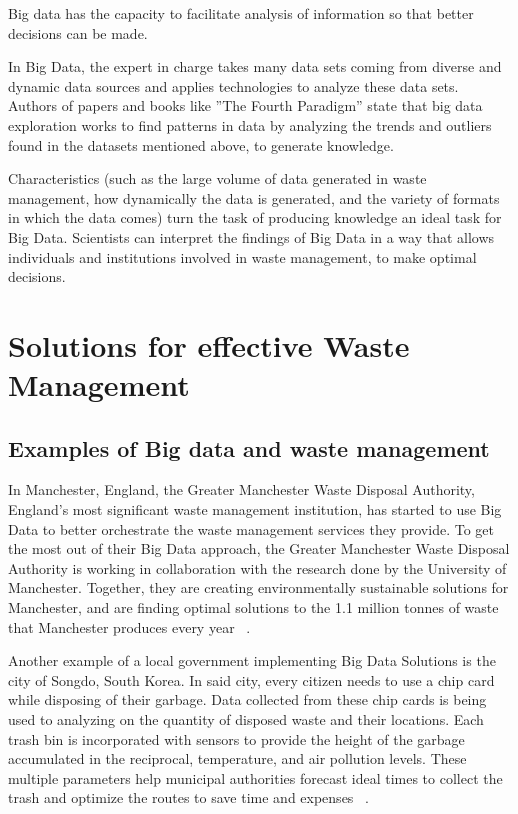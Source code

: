 \documentclass[sigconf]{acmart}
\begin{document}
Big data has the capacity to facilitate analysis of information so that better decisions can be made.

In Big Data, the expert in charge takes many data sets coming from diverse and dynamic data sources and applies technologies to analyze these data sets.  Authors of papers and books like ''The Fourth Paradigm'' state that big data exploration works to find patterns in data by analyzing the trends and outliers found in the datasets mentioned above, to generate knowledge. ~\cite{hey2009fourth}

Characteristics (such as the large volume of data generated in waste management, how dynamically the data is generated, and the variety of formats in which the data comes) turn the task of producing knowledge an ideal task for Big Data.  Scientists can interpret the findings of Big Data  in a way that allows individuals and institutions involved in waste management, to make optimal decisions.~\cite{yenkar2014review}  

\section{Solutions for effective Waste Management}

\subsection{ Examples of Big data and waste management}

In Manchester, England, the Greater Manchester Waste Disposal Authority, England's most significant waste management institution, has started to use Big Data to better orchestrate the waste management services they provide. To get the most out of their Big Data approach, the Greater Manchester Waste Disposal Authority is working in collaboration with the research done by the University of Manchester. Together, they are creating environmentally sustainable solutions for Manchester, and are finding optimal solutions to the 1.1 million tonnes of waste that Manchester produces every year ~\cite{markvan2016}. 

Another example of a local government implementing Big Data Solutions is the city of  Songdo, South Korea. In said city, every citizen needs to use a chip card while disposing of their garbage. Data collected from these chip cards is being used to analyzing on the quantity of disposed waste and their locations. Each trash bin is incorporated with sensors to provide the height of the garbage accumulated in the reciprocal, temperature, and air pollution levels. These multiple parameters help municipal authorities forecast ideal times to collect the trash and optimize the routes to save time and expenses ~\cite{markvan2016}.
\end{document}
